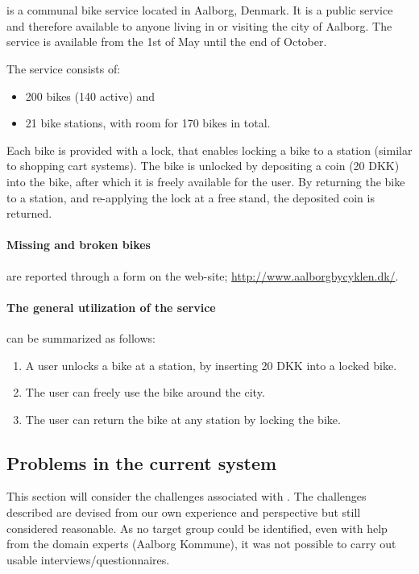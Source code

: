 \section{\citybike}\label{aalborg_bycyklen}
\citybike is a communal bike service located in Aalborg, Denmark.
It is a public service and therefore available to anyone living in or visiting the city of Aalborg.
The service is available from the 1st of May until the end of October.\cite{aalborgbycyklenbagcyklen}

\noindent The service consists of:
\begin{itemize}
\item 200 bikes (140 active) and 
\item 21 bike stations, with room for 170 bikes in total.
\end{itemize}
Each bike is provided with a lock, that enables locking a bike to a station (similar to shopping cart systems).
The bike is unlocked by depositing a coin (20 DKK) into the bike, after which it is freely available for the user.
By returning the bike to a station, and re-applying the lock at a free stand, the deposited coin is returned.

\paragraph{Missing and broken bikes} are reported through a form on the \citybike web-site; \url{http://www.aalborgbycyklen.dk/}.

\paragraph{The general utilization of the service} can be summarized as follows:
\begin{enumerate}
\item A user unlocks a bike at a station, by inserting 20 DKK into a locked bike.
\item The user can freely use the bike around the city.
\item The user can return the bike at any station by locking the bike.
\end{enumerate}

\subsection{Problems in the current system} \label{aalborg_bycyklen:challenges}
This section will consider the challenges associated with \citybike.
The challenges described are devised from our own experience and perspective but still considered reasonable.
As no target group could be identified, even with help from the domain experts (Aalborg Kommune), it was not possible to carry out usable interviews/questionnaires.

